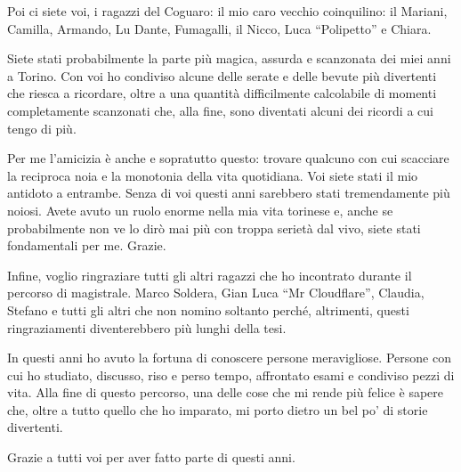 Poi ci siete voi, i ragazzi del Coguaro: il mio caro vecchio coinquilino: il Mariani, Camilla, Armando, Lu Dante, Fumagalli, il Nicco, Luca “Polipetto” e Chiara.

Siete stati probabilmente la parte più magica, assurda e scanzonata dei miei anni a Torino. Con voi ho condiviso alcune delle serate e delle bevute più divertenti che riesca a ricordare, oltre a una quantità difficilmente calcolabile di momenti completamente scanzonati che, alla fine, sono diventati alcuni dei ricordi a cui tengo di più.

Per me l'amicizia è anche e sopratutto questo: trovare qualcuno con cui scacciare la reciproca noia e la monotonia della vita quotidiana. Voi siete stati il mio antidoto a entrambe. Senza di voi questi anni sarebbero stati tremendamente più noiosi. Avete avuto un ruolo enorme nella mia vita torinese e, anche se probabilmente non ve lo dirò mai più con troppa serietà dal vivo, siete stati fondamentali per me. Grazie.

Infine, voglio ringraziare tutti gli altri ragazzi che ho incontrato durante il percorso di magistrale. Marco Soldera, Gian Luca “Mr Cloudflare”, Claudia, Stefano e tutti gli altri che non nomino soltanto perché, altrimenti, questi ringraziamenti diventerebbero più lunghi della tesi.

In questi anni ho avuto la fortuna di conoscere persone meravigliose. Persone con cui ho studiato, discusso, riso e perso tempo, affrontato esami e condiviso pezzi di vita. Alla fine di questo percorso, una delle cose che mi rende più felice è sapere che, oltre a tutto quello che ho imparato, mi porto dietro un bel po' di storie divertenti.

Grazie a tutti voi per aver fatto parte di questi anni.
